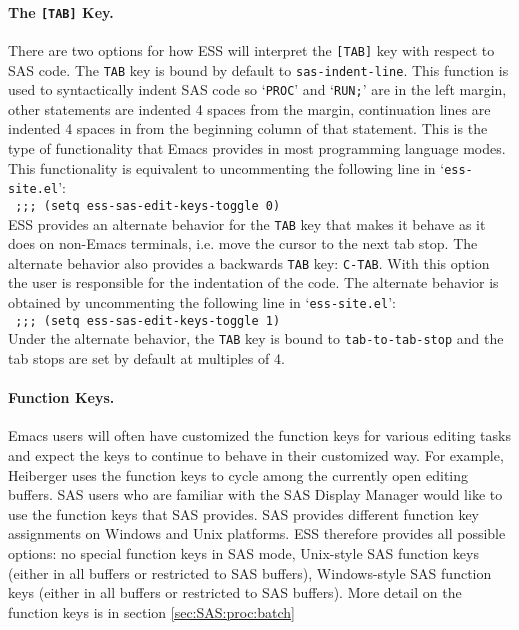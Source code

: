 \documentclass{article}
\newcommand{\stexttt}[1]{{\small\texttt{#1}}}
\newcommand{\elcode}[1]{\\{\stexttt{\hspace*{2em} #1}}\\}
\newcommand{\file}[1]{`\stexttt{#1}'}
\begin{document}
\paragraph{The \texttt{[TAB]} Key.}
\label{sec:SAS:tab}

There are two options for how ESS will interpret the \stexttt{[TAB]} key
with respect to SAS code.  The \stexttt{TAB} key is bound by default to
\stexttt{sas-indent-line}.  This function is used to syntactically
indent SAS code so `\stexttt{PROC}' and `\stexttt{RUN;}' are in the left
margin, other statements are indented 4 spaces from the margin,
continuation lines are indented 4 spaces in from the beginning column of
that statement.  This is the type of functionality that Emacs provides
in most programming language modes.  This functionality is equivalent to
uncommenting the following line in \file{ess-site.el}: \elcode{;;; (setq
  ess-sas-edit-keys-toggle 0)}

ESS provides an alternate behavior for the \stexttt{TAB} key that
makes it behave as it does on non-Emacs terminals, i.e. move the
cursor to the next tab stop.  The alternate behavior also provides a
backwards \stexttt{TAB} key: \stexttt{C-TAB}.  With this option the
user is responsible for the indentation of the code.  The alternate
behavior is obtained by uncommenting the following line in
\file{ess-site.el}: \elcode{;;; (setq ess-sas-edit-keys-toggle 1)}
Under the alternate behavior, the \stexttt{TAB} key is bound to
\stexttt{tab-to-tab-stop} and the tab stops are set by default at
multiples of 4.

\paragraph{Function Keys.}
Emacs users will often have customized the function keys for various
editing tasks and expect the keys to continue to behave in their
customized way.  For example, Heiberger uses the function keys to
cycle among the currently open editing buffers.  SAS users who are
familiar with the SAS Display Manager would like to use the function
keys that SAS provides.  SAS provides different function key
assignments on Windows and Unix platforms.  ESS therefore provides all
possible options: no special function keys in SAS mode, Unix-style SAS
function keys (either in all buffers or restricted to SAS buffers),
Windows-style SAS function keys (either in all buffers or restricted
to SAS buffers).  More detail on the function keys is in section
\ref{sec:SAS:proc:batch}
\end{document}
